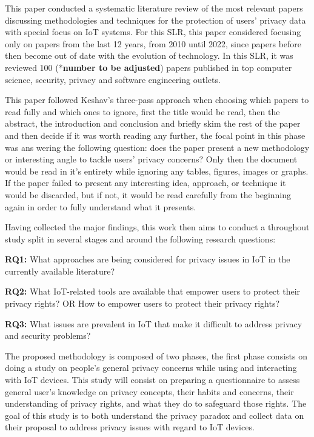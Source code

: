 \documentclass[conference]{IEEEtran}
\begin{document}
This paper conducted a systematic literature review of the most relevant papers
discussing methodologies and techniques for the protection of users' privacy
data with special focus on IoT systems. For this SLR, this paper considered
focusing only on papers from the last 12 years, from 2010 until 2022, since
papers before then become out of date with the evolution of technology. In
this SLR, it was reviewed 100 (*\textbf{\color{red}number to be adjusted})
papers published in top computer science, security, privacy and software
engineering outlets.

This paper followed Keshav's three-pass approach \cite{KeshavHow} when choosing
which papers to read fully and which ones to ignore, first the title would
be read, then the abstract, the introduction and conclusion and briefly skim
the rest of the paper and then decide if it was worth reading any further,
the focal point in this phase was ans wering the following question: does
the paper present a new methodology or interesting angle to tackle users'
privacy concerns? Only then the document would be read in it's entirety while
ignoring any tables, figures, images or graphs. If the paper failed to present
any interesting idea, approach, or technique it would be discarded, but if
not, it would be read carefully from the beginning again in order to fully
understand what it presents.

Having collected the major findings, this work then aims to conduct a throughout
study split in several stages and around the following research questions:

\textbf{RQ1:} What approaches are being considered for privacy issues in
IoT in the currently available literature?

\textbf{RQ2:} What IoT-related tools are available that empower users to
protect their privacy rights? OR How to empower users to protect their privacy
rights?

\textbf{RQ3:} What issues are prevalent in IoT that make it difficult to
address privacy and security problems?

The proposed methodology is composed of two phases, the first phase consists
on doing a study on people's general privacy concerns while using and interacting
with IoT devices. This study will consist on preparing a questionnaire to assess
general user's knowledge on privacy concepts, their habits and concerns, their
understanding of privacy rights, and what they do to safeguard those rights.
The goal of this study is to both understand the privacy
paradox and collect data on their proposal to address privacy issues with regard
to IoT devices.
\end{document}
